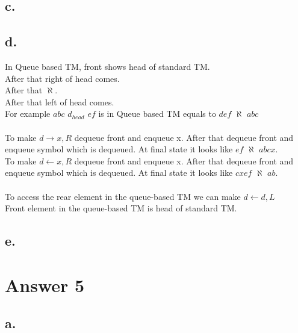 \documentclass[12pt]{article}
\begin{document}
\subsection*{c.}



\subsection*{d.}

In Queue based TM, front shows head of standard TM.\\
After that right of head comes.\\
After that $\aleph$.\\
After that left of head comes.\\
For example $abc$ $d_{head}$ $ef$ is in Queue based TM equals to $def$ $\aleph$ $abc$\\\\
To make $d \rightarrow x, R$ dequeue front and enqueue x. After that dequeue front and enqueue symbol which is dequeued. At final state it looks like $ef$ $\aleph$ $abcx$.\\
To make $d \leftarrow x, R$ dequeue front and enqueue x. After that dequeue front and enqueue symbol which is dequeued. At final state it looks like $cxef$ $\aleph$ $ab$.\\\\
To access the rear element in the queue-based TM we can make $d \leftarrow d, L$\\
Front element in the queue-based TM is head of standard TM.

\subsection*{e.}




\section*{Answer 5}

\subsection*{a.}
\end{document}
